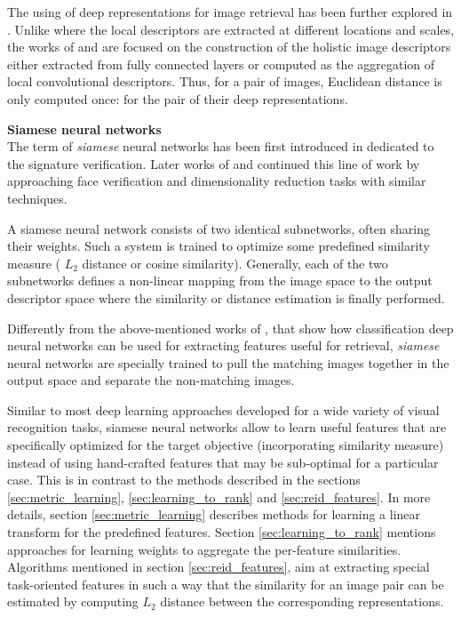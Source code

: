 The using of deep representations for image retrieval has been further explored in \citep{babenko2014neural,babenko2015aggregating}. Unlike \citep{Razavian14} where the local descriptors are extracted at different locations and scales, the works of \citep{babenko2014neural} and \citep{babenko2015aggregating} are focused on the construction of the holistic image descriptors either extracted from fully connected layers or computed as the aggregation of local convolutional descriptors. Thus, for a pair of images, Euclidean distance is only computed once: for the pair of their deep representations.

\bigskip\ident\textbf{Siamese neural networks}\\
The term of \textit{siamese} neural networks has been first introduced in  \citep{Bromley93} dedicated to the signature verification. Later works of \citep{Chopra05} and \citep{hadsell2006dimensionality} continued this line of work by approaching face verification and dimensionality reduction tasks with similar techniques. 

A siamese neural network consists of two identical subnetworks, often sharing their weights. Such a system is trained to optimize some predefined similarity measure (\eg{} $L_2$ distance or cosine similarity). Generally, each of the two subnetworks defines a non-linear mapping from the image space to the output descriptor space where the similarity or distance estimation is finally performed. 

Differently from the above-mentioned works of \citep{Krizhevsky12, Razavian14,babenko2014neural,babenko2015aggregating}, that show how  classification deep neural networks can be used for extracting features useful for retrieval, \textit{siamese} neural networks are specially trained to pull the matching images together in the output space and separate the non-matching images. 

Similar to most deep learning approaches developed for a wide variety of visual recognition tasks, siamese neural networks allow to learn useful features that are specifically optimized for the target objective (incorporating similarity measure) instead of using hand-crafted features that may be sub-optimal for a particular case. This is in contrast to the methods described in the sections \ref{sec:metric_learning}, \ref{sec:learning_to_rank} and \ref{sec:reid_features}. In more details, section \ref{sec:metric_learning} describes methods for learning a linear transform for the predefined features. Section \ref{sec:learning_to_rank} mentions approaches for  learning weights to aggregate the per-feature similarities. Algorithms mentioned in section  
\ref{sec:reid_features}, aim at extracting special task-oriented features in such a way that the similarity for an image pair can be estimated by computing $L_2$ distance between the corresponding representations.



